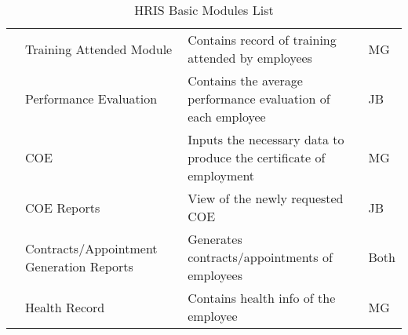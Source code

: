\begin{table}[H]
\begin{tabularx}{\textwidth}{|p{2cm}|p{3.5cm}|X|p{1.5cm}|}
                        & Training Attended Module                 & Contains record of training attended by employees                                     & MG               \\
                        & Performance Evaluation                   & Contains the average performance evaluation of each employee                          & JB               \\
                        & COE                                      & Inputs the necessary data to produce the certificate of employment                    & MG               \\
                        & COE Reports                              & View of the newly requested COE                                                       & JB               \\
                        & Contracts/Appointment Generation Reports & Generates contracts/appointments of employees                                         & Both             \\
                        & Health Record                            & Contains health info of the employee                                                  & MG               \\ \bottomrule
    \end{tabularx}
    \caption{HRIS Basic Modules List}
    \label{tab:hris-basic-modules}
\end{table}

